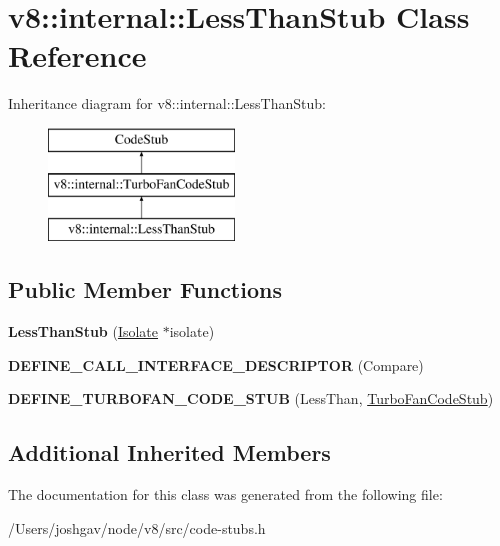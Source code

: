 \hypertarget{classv8_1_1internal_1_1_less_than_stub}{}\section{v8\+:\+:internal\+:\+:Less\+Than\+Stub Class Reference}
\label{classv8_1_1internal_1_1_less_than_stub}
Inheritance diagram for v8\+:\+:internal\+:\+:Less\+Than\+Stub\+:\begin{figure}[H]
\begin{center}
\leavevmode
\includegraphics[height=3.000000cm]{classv8_1_1internal_1_1_less_than_stub}
\end{center}
\end{figure}
\subsection*{Public Member Functions}
\begin{DoxyCompactItemize}
\item 
{\bfseries Less\+Than\+Stub} (\hyperlink{classv8_1_1internal_1_1_isolate}{Isolate} $\ast$isolate)\hypertarget{classv8_1_1internal_1_1_less_than_stub_a6a41626a85c84203eb49c237a3ed9fb7}{}\label{classv8_1_1internal_1_1_less_than_stub_a6a41626a85c84203eb49c237a3ed9fb7}

\item 
{\bfseries D\+E\+F\+I\+N\+E\+\_\+\+C\+A\+L\+L\+\_\+\+I\+N\+T\+E\+R\+F\+A\+C\+E\+\_\+\+D\+E\+S\+C\+R\+I\+P\+T\+OR} (Compare)\hypertarget{classv8_1_1internal_1_1_less_than_stub_a5eab3fa137b31609516cabffbfe430fa}{}\label{classv8_1_1internal_1_1_less_than_stub_a5eab3fa137b31609516cabffbfe430fa}

\item 
{\bfseries D\+E\+F\+I\+N\+E\+\_\+\+T\+U\+R\+B\+O\+F\+A\+N\+\_\+\+C\+O\+D\+E\+\_\+\+S\+T\+UB} (Less\+Than, \hyperlink{classv8_1_1internal_1_1_turbo_fan_code_stub}{Turbo\+Fan\+Code\+Stub})\hypertarget{classv8_1_1internal_1_1_less_than_stub_ac504a43727b2495118150c125b3bc9a6}{}\label{classv8_1_1internal_1_1_less_than_stub_ac504a43727b2495118150c125b3bc9a6}

\end{DoxyCompactItemize}
\subsection*{Additional Inherited Members}


The documentation for this class was generated from the following file\+:\begin{DoxyCompactItemize}
\item 
/\+Users/joshgav/node/v8/src/code-\/stubs.\+h\end{DoxyCompactItemize}
